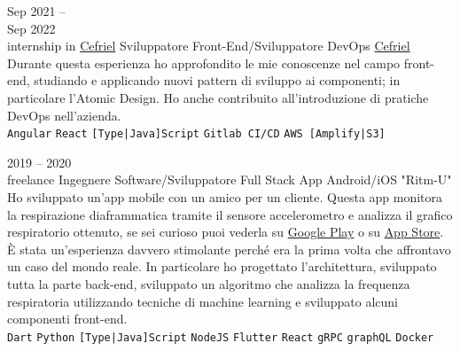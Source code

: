 \documentclass[9pt]{developercv} %
\begin{document}
\begin{entrylist}
	\entry
	{Sep 2021 -- \\Sep 2022\\\footnotesize{internship in \href{https://www.cefriel.com/}{Cefriel}}}
	{Sviluppatore Front-End/Sviluppatore DevOps}
	{\href{https://www.cefriel.com/}{Cefriel}}
	{
		Durante questa esperienza ho approfondito le mie conoscenze nel campo front-end, studiando e applicando nuovi pattern di sviluppo ai componenti; in particolare l'Atomic Design.
		\newline Ho anche contribuito all'introduzione di pratiche DevOps nell'azienda.
		\\
		\texttt{Angular}\slashsep
		\texttt{React}\slashsep
		\texttt{[Type|Java]Script}\slashsep
		\texttt{Gitlab CI/CD}\slashsep
		\texttt{AWS [Amplify|S3]}
	}
\end{entrylist}

\begin{entrylist}
	\entry
	{2019 -- 2020\\\footnotesize{freelance}}
	{Ingegnere Software/Sviluppatore Full Stack}
	{App Android/iOS "Ritm-U"}
	{
		Ho sviluppato un'app mobile con un amico per un cliente. Questa app
		monitora la respirazione diaframmatica tramite il sensore accelerometro
		e analizza il grafico respiratorio ottenuto, se sei curioso puoi vederla su
		\href{https://play.google.com/store/apps/details?id=com.ritmu.app}{Google Play}
		o su \href{https://apps.apple.com/us/app/id1514766559}{App Store}. È stata un'esperienza davvero stimolante
		perché era la prima volta che affrontavo un caso del mondo reale. In particolare
		ho progettato l'architettura, sviluppato tutta la parte back-end,
		sviluppato un algoritmo che analizza la frequenza respiratoria utilizzando tecniche di machine learning e sviluppato alcuni componenti front-end.
		\\
		\texttt{Dart}\slashsep
		\texttt{Python}\slashsep
		\texttt{[Type|Java]Script}\slashsep
		\texttt{NodeJS}\slashsep
		\texttt{Flutter}\slashsep
		\texttt{React}\slashsep
		\texttt{gRPC}\slashsep
		\texttt{graphQL}\slashsep
		\texttt{Docker}
	}
\end{entrylist}



\end{document}

